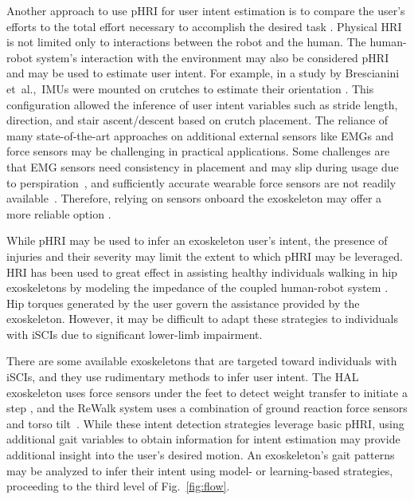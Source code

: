 Another approach to use pHRI for user intent estimation is to compare the user's efforts to the total effort necessary to accomplish the desired task \cite{pehlivan2015minimal}. Physical HRI is not limited only to interactions between the robot and the human. The human-robot system's interaction with the environment may also be considered pHRI and may be used to estimate user intent. For example, in a study by Brescianini \mbox{et al.,}~IMUs were mounted on crutches to estimate their orientation \cite{brescianini2011ins}. This configuration allowed the inference of user intent variables such as stride length, direction, and stair ascent/descent based on crutch placement. The reliance of many state-of-the-art approaches on additional external sensors like EMGs and force sensors may be challenging in practical applications. Some challenges are that EMG sensors need consistency in placement and may slip during usage due to perspiration~\mbox{\cite{tkach2010study,ison2014role}}, and sufficiently accurate wearable force sensors are not readily available~\cite{moolchandani2021design}. Therefore, relying on sensors onboard the exoskeleton may offer a more reliable option \cite{Gambon20b}. 

While pHRI may be used to infer an exoskeleton user's intent, the presence of injuries and their severity may limit the extent to which pHRI may be leveraged. HRI has been used to great effect in assisting healthy individuals walking in hip exoskeletons by modeling the impedance of the coupled human-robot system \cite{zhang2019admittance,nagarajan2016integral}. Hip torques generated by the user govern the assistance provided by the exoskeleton. However, it may be difficult to adapt these strategies to individuals with iSCIs due to significant lower-limb impairment. 

There are some available exoskeletons that are targeted toward individuals with iSCIs, and they use rudimentary methods to infer user intent. The HAL exoskeleton uses force sensors under the feet to detect weight transfer to initiate a step \cite{suzuki2007intention}, and the ReWalk system uses a combination of ground reaction force sensors and torso tilt~\cite{goffer2012locomotion}. While these intent detection strategies leverage basic pHRI, using additional gait variables to obtain information for intent estimation may provide additional insight into the user's desired motion. An exoskeleton's gait patterns may be analyzed to infer their intent using model- or learning-based strategies, proceeding to the third level of Fig.~\ref{fig:flow}. 

